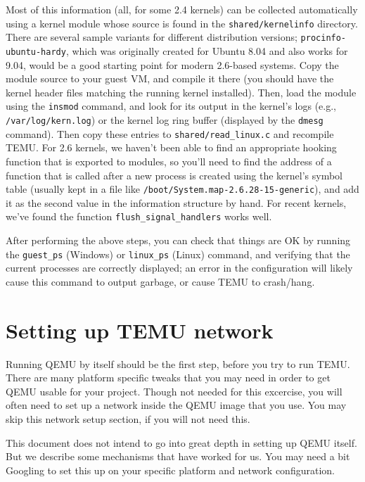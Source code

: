 \begin{itemize}
Most of this information (all, for some 2.4 kernels) can be collected
automatically using a kernel module whose source is found in the
\texttt{shared/kernelinfo} directory.
There are several sample variants for different distribution versions;
\texttt{procinfo-ubuntu-hardy}, which was originally created for Ubuntu
8.04 and also works for 9.04, would be a good starting point for
modern 2.6-based systems.
Copy the module source to your guest VM, and compile it there (you
should have the kernel header files matching the running kernel
installed).
Then, load the module using the \texttt{insmod} command, and look for
its output in the kernel's logs (e.g., \texttt{/var/log/kern.log}) or
the kernel log ring buffer (displayed by the \texttt{dmesg} command).
Then copy these entries to \texttt{shared/read\_linux.c} and recompile
TEMU.
For 2.6 kernels, we haven't been able to find an appropriate hooking
function that is exported to modules, so you'll need to find the
address of a function that is called after a new process is created
using the kernel's symbol table (usually kept in a file like
\texttt{/boot/System.map-2.6.28-15-generic}), and add it as the second
value in the information structure by hand.
For recent kernels, we've found the function
\texttt{flush\_signal\_handlers} works well.
\end{itemize}

After performing the above steps, you can check that things are OK by 
running the \texttt{guest\_ps} (Windows) or \texttt{linux\_ps} (Linux) command, and 
verifying that the current processes are correctly displayed; an error in the configuration 
will likely cause this command to output garbage, or cause TEMU to crash/hang.

\section {Setting up TEMU network}
\label {sec:setup}

Running QEMU by itself should be the first step, before you try to run
TEMU. There are many platform specific tweaks that you may need in
order to get QEMU usable for your project. Though not needed for this
excercise, you will often need to set up a network inside the QEMU
image that you use. You may skip this network setup section, if you
will not need this.

This document does not intend to go into great depth in setting up
QEMU itself.  But we describe some mechanisms that have worked for
us. You may need a bit Googling to set this up on your specific
platform and network configuration.


